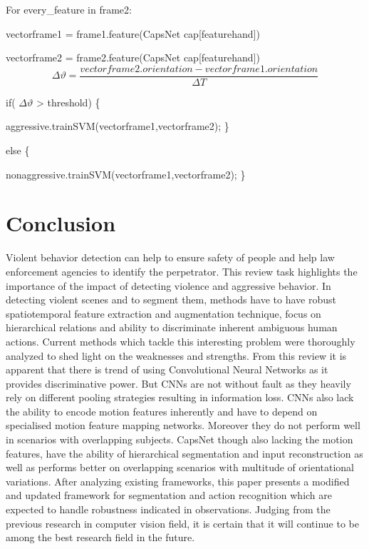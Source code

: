 \documentclass[11pt,english]{article}
\begin{document}
For every\_feature in frame2:

	vectorframe1 = frame1.feature(CapsNet cap[featurehand])
    
	vectorframe2 = frame2.feature(CapsNet cap[featurehand])
    $$\Delta\vartheta = \frac{vectorframe2.orientation - vectorframe1.orientation}{\Delta T}$$

	

if( $\Delta \vartheta$ > threshold)
	 \{
		
        aggressive.trainSVM(vectorframe1,vectorframe2);
     \}

else	
    \{
    
    	nonaggressive.trainSVM(vectorframe1,vectorframe2);
        \}







\section{Conclusion}
Violent behavior detection can help to ensure safety of people and help law enforcement agencies to identify the perpetrator. This review task highlights the importance of the impact of detecting violence and aggressive behavior. In detecting violent scenes and to segment them, methods have to have robust spatiotemporal feature extraction and augmentation technique, focus on  hierarchical relations and ability to discriminate inherent ambiguous human actions. Current methods which tackle this interesting problem were thoroughly analyzed to shed light on the weaknesses and strengths. From this review it is apparent that there is trend of using Convolutional Neural Networks as it provides discriminative power. But CNNs are not without fault as they heavily rely on different pooling strategies resulting in information loss. CNNs also lack the ability to encode motion features inherently and have to depend on specialised motion feature mapping networks. Moreover they do not perform well in scenarios with overlapping subjects. CapsNet though also lacking the motion features, have the ability of hierarchical segmentation and input reconstruction as well as performs better on overlapping scenarios with multitude of orientational variations. After analyzing existing frameworks, this paper presents a modified and updated framework for segmentation and action recognition which are expected to handle robustness indicated in observations. Judging from the previous research in computer vision field, it is certain that it will continue to be among the best research field in the future.



\end{document}
